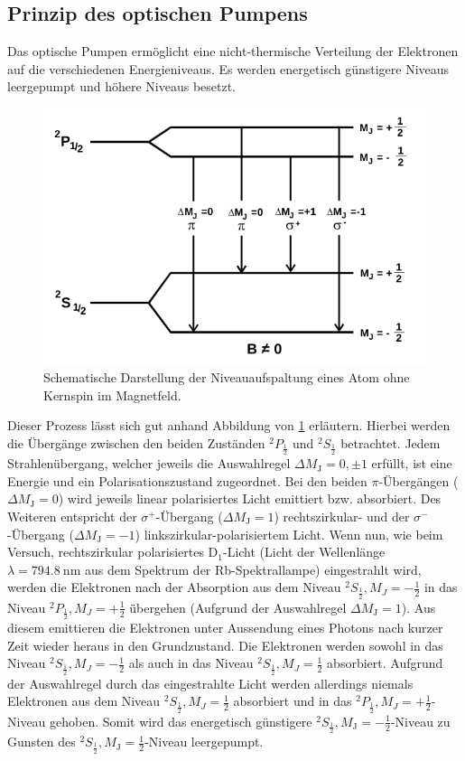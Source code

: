 \subsection{Prinzip des optischen Pumpens}
Das optische Pumpen ermöglicht eine nicht-thermische Verteilung der
Elektronen auf die verschiedenen Energieniveaus. Es werden energetisch
günstigere Niveaus leergepumpt und höhere Niveaus besetzt.
\begin{figure}
  \centering
  \includegraphics[width=0.9\columnwidth]{pictures/niveaus.png}
  \caption{Schematische Darstellung der Niveauaufspaltung eines Atom ohne Kernspin im Magnetfeld.\cite{Anleitung}}
  \label{fig:übergaenge_alkali}
\end{figure}
Dieser Prozess lässt sich gut anhand Abbildung von \ref{fig:übergaenge_alkali}
erläutern.
Hierbei werden die Übergänge zwischen den beiden Zuständen $^2P_{\frac{1}{2}}$ und $^2S_{\frac{1}{2}}$ betrachtet.
Jedem Strahlenübergang, welcher jeweils die Auswahlregel $\Delta M_{\mathrm{J}} = 0, \pm 1$ erfüllt, ist eine Energie und ein Polarisationszustand zugeordnet.
Bei den beiden $\pi$-Übergängen ($\Delta M_{\mathrm{J}} = 0$) wird jeweils linear polarisiertes Licht
emittiert bzw. absorbiert. Des Weiteren entspricht der $\sigma^+$-Übergang ($\Delta M_{\mathrm{J}} = 1$)
rechtszirkular- und der $\sigma^-$-Übergang ($\Delta M_{\mathrm{J}} = -1$) linkszirkular-polarisiertem Licht.
Wenn nun, wie beim Versuch, rechtszirkular polarisiertes D$_1$-Licht (Licht der Wellenlänge $\lambda= \SI{794.8}{\nano\meter}$ aus dem Spektrum der Rb-Spektrallampe)
eingestrahlt wird, werden die Elektronen nach der Absorption aus
dem Niveau $^2S_{\frac{1}{2}}, M_J = -\frac{1}{2}$ in das Niveau
$^2P_{\frac{1}{2}}, M_J = +\frac{1}{2}$ übergehen (Aufgrund der Auswahlregel $\Delta M_{\mathrm{J}} = 1$).
Aus diesem emittieren die Elektronen unter Aussendung eines Photons nach kurzer Zeit wieder heraus in den Grundzustand.
Die Elektronen werden sowohl in das Niveau $^2S_{\frac{1}{2}}, M_J = -\frac{1}{2}$ als auch in das Niveau $^2S_{\frac{1}{2}}, M_J = \frac{1}{2}$ absorbiert.
Aufgrund der Auswahlregel durch das eingestrahlte Licht werden allerdings niemals Elektronen aus dem Niveau $^2S_{\frac{1}{2}}, M_J = \frac{1}{2}$ absorbiert und in das $^2P_{\frac{1}{2}}, M_J = +\frac{1}{2}$-Niveau gehoben.
Somit wird das energetisch günstigere $^2S_{\frac{1}{2}}, M_{\mathrm{J}} = -\frac{1}{2}$-Niveau zu Gunsten des $^2S_{\frac{1}{2}}, M_{\mathrm{J}} = \frac{1}{2}$-Niveau leergepumpt.

